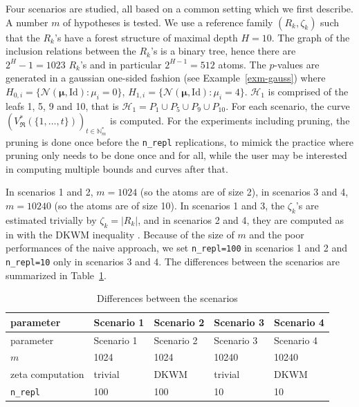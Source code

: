 \documentclass[
  11pt,
  a4paper,
]{article}
\theoremstyle{plain}
\theoremstyle{definition}
\theoremstyle{plain}
\theoremstyle{definition}
\theoremstyle{plain}
\theoremstyle{remark}
\begin{document}
Four scenarios are studied, all based on a common setting which we first
describe. A number \(m\) of hypotheses is tested. We use a reference
family \((R_k,\zeta_k)\) such that the \(R_k\)'s have a forest structure
of maximal depth \(H=10\). The graph of the inclusion relations between
the \(R_k\)'s is a binary tree, hence there are \(2^H-1=1023\) \(R_k\)'s
and in particular \(2^{H-1}=512\) atoms. The \(p\)-values are generated
in a gaussian one-sided fashion (see Example~\ref{exm-gauss}) where
\(H_{0,i}= \{ \mathcal N(\boldsymbol{\mu}, \mathrm{Id})  :\mu_i=0 \}\),
\(H_{1,i}=\{ \mathcal N(\boldsymbol{\mu}, \mathrm{Id}) :\mu_i=4 \}\).
\(\mathcal{H}_1\) is comprised of the leafs 1, 5, 9 and 10, that is
\(\mathcal{H}_1=P_1\cup P_5\cup P_9\cup P_{10}\). For each scenario, the
curve
\(\left(V^*_{\mathfrak{R}}(\{1,\dotsc,t \})\right)_{t\in\mathbb{N}_m^*}\)
is computed. For the experiments including pruning, the pruning is done
once before the \texttt{n\_repl} replications, to mimick the practice
where pruning only needs to be done once and for all, while the user may
be interested in computing multiple bounds and curves after that.

In scenarios 1 and 2, \(m=1024\) (so the atoms are of size 2), in
scenarios 3 and 4, \(m=10240\) (so the atoms are of size 10). In
scenarios 1 and 3, the \(\zeta_k\)'s are estimated trivially by
\(\zeta_k=|R_k|\), and in scenarios 2 and 4, they are computed as in
\citet{MR4178188} with the DKWM inequality \citetext{\citealp[
]{MR0083864}; \citealp{MR1062069}}. Because of the size of \(m\) and the
poor performances of the naive approach, we set \texttt{n\_repl=100} in
scenarios 1 and 2 and \texttt{n\_repl=10} only in scenarios 3 and 4. The
differences between the scenarios are summarized in
Table~\ref{tbl-scenarios}.

\begin{longtable}[]{@{}lllll@{}}
\caption{Differences between the
scenarios}\label{tbl-scenarios}\tabularnewline
\toprule\noalign{}
parameter & Scenario 1 & Scenario 2 & Scenario 3 & Scenario 4 \\
\midrule\noalign{}
\endfirsthead
\toprule\noalign{}
parameter & Scenario 1 & Scenario 2 & Scenario 3 & Scenario 4 \\
\midrule\noalign{}
\endhead
\bottomrule\noalign{}
\endlastfoot
\(m\) & 1024 & 1024 & 10240 & 10240 \\
zeta computation & trivial & DKWM & trivial & DKWM \\
\texttt{n\_repl} & 100 & 100 & 10 & 10 \\
\end{longtable}
\end{document}
